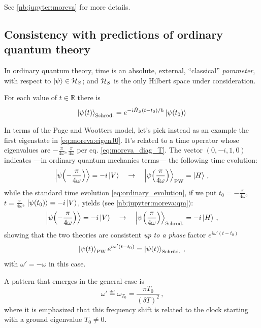 See \ref{nb:jupyter:moreva} for more details.

\subsection{Consistency with predictions of ordinary quantum theory}

In ordinary quantum theory, time is an absolute, external, ``classical'' \emph{parameter},
with respect to $\ket{\psi} \in \mathcal{H}_S$; and $\mathcal{H}_S$
is the only Hilbert space under consideration.

For each value of $t \in \mathbb{R}$ there is
\begin{equation}\label{eq:ordinary_evolution}
  \ket{\psi(t)}_{\text{Schr\"od.}} =
  e^{-i\hat{H}_{S}(t-t_0)/\hbar}\ket{\psi(t_0)}
\end{equation}

In terms of the Page and Wootters model,
let's pick instead as an example the first eigenstate in \eqref{eq:moreva:eigenJ0}.
It's related to a time operator whose eigenvalues are
$-\frac{\pi}{4\omega}, \frac{\pi}{4\omega}$
per eq. \eqref{eq:moreva_diag_T}.
The vector $(0, -i, 1, 0)$ indicates ---in ordinary quantum mechanics terms---
the following time evolution:
\begin{equation}
  \ket{\psi\qty(-\frac{\pi}{4\omega})} = -i\ket{V}
  \quad \rightarrow \quad
  \ket{\psi\qty( \frac{\pi}{4\omega})}_{\mathrm{PW}} =   \ket{H}
  \, \text{,}
\end{equation}
while the standard time evolution \eqref{eq:ordinary_evolution}, if we put
$t_0 = -\frac{\pi}{4\omega}$, $t = \frac{\pi}{4\omega}$, $\ket{\psi\qty(t_0)} = -i\ket{V}$,
yields (see \ref{nb:jupyter:moreva:qm}):
\begin{equation}
  \ket{\psi\qty(-\frac{\pi}{4\omega})} = -i\ket{V}
  \quad \rightarrow \quad
  \ket{\psi\qty( \frac{\pi}{4\omega})}_{\mathrm{Schr\ddot{o}d.}} = -i\ket{H}
  \, \text{,}
\end{equation}
showing that the two theories are consistent \emph{up to a phase} factor
$e^{i\omega'(t - t_{0})}$
\begin{equation}
  \ket{\psi(t)}_{\mathrm{PW}} e^{i\omega'(t - t_{0})} = \ket{\psi(t)}_{\mathrm{Schr\ddot{o}d.}} \,\text{,}  
\end{equation}
with $\omega' = -\omega$ in this case.

A pattern that emerges in the general case is
\[
  \omega' \eqdef \omega_{T_{0}} = \frac{\pi T_0}{(\delta T)^2} \,\text{,}
\]
where it is emphasized that this frequency shift is related to the clock starting
with a ground eigenvalue $T_0 \ne 0$.

